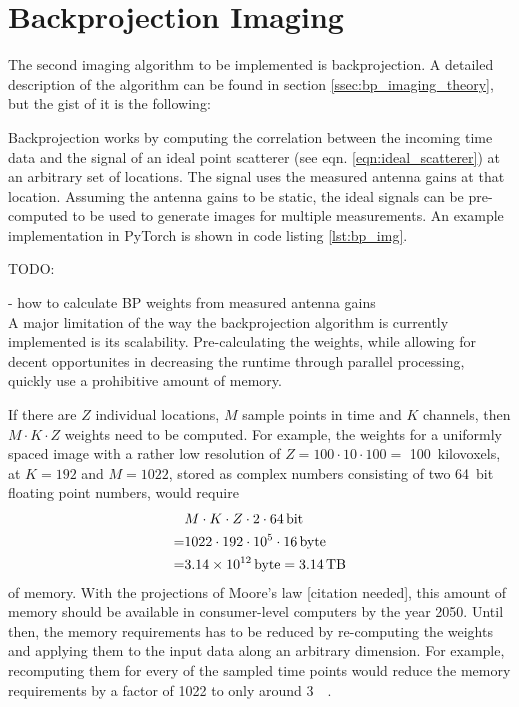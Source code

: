 \section{Backprojection Imaging}

The second imaging algorithm to be implemented is backprojection.
A detailed description of the algorithm can be found in section \ref{ssec:bp_imaging_theory},
but the gist of it is the following:

Backprojection works by computing the correlation between the incoming time data
and the signal of an ideal point scatterer (see eqn. \ref{eqn:ideal_scatterer})
at an arbitrary set of locations. The signal uses the measured antenna gains at that location.
Assuming the antenna gains to be static,
the ideal signals can be pre-computed to be used to generate images for multiple measurements.
An example implementation in PyTorch is shown in code listing \ref{lst:bp_img}.

TODO:

- how to calculate BP weights from measured antenna gains
\\

A major limitation of the way the backprojection algorithm is currently implemented is its scalability.
Pre-calculating the weights, while allowing for decent opportunites in decreasing the runtime through parallel processing,
quickly use a prohibitive amount of memory.

If there are $Z$ individual locations, $M$ sample points in time and $K$ channels, then $M \cdot K \cdot Z$ weights need to be computed.
For example, the weights for a uniformly spaced image with a rather low resolution of  $Z = 100 \cdot 10 \cdot 100 =$ \SI{100}{kilovoxels},
at $K=192$ and $M=1022$, stored as complex numbers consisting of two \SI{64}{bit} floating point numbers, would require
\begin{align*}
      & M \cdot K \cdot Z \cdot 2 \cdot \SI{64}{\bit} \\
    = & 1022 \cdot 192 \cdot 10^5 \cdot \SI{16}{byte} \\
    = & \SI{3.14e12}{byte} = \SI{3.14}{\tera\byte}
\end{align*}
of memory.
With the projections of Moore's law [citation needed],
this amount of memory should be available in consumer-level computers by the year 2050.
Until then, the memory requirements has to be reduced by re-computing the weights
and applying them to the input data along an arbitrary dimension.
For example, recomputing them for every of the sampled time points would reduce
the memory requirements by a factor of 1022 to only around \SI{3}{\giga\byte}.



